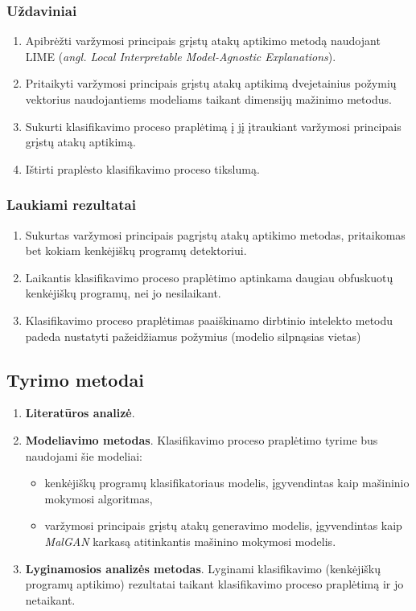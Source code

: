 \subsubsection{Uždaviniai}
\begin{enumerate}
    \item Apibrėžti varžymosi principais grįstų atakų aptikimo metodą naudojant LIME
          (\textit{angl. Local Interpretable Model-Agnostic Explanations}).
    \item Pritaikyti varžymosi principais grįstų atakų aptikimą dvejetainius požymių
          vektorius naudojantiems modeliams taikant dimensijų mažinimo metodus.
    \item Sukurti klasifikavimo proceso praplėtimą į jį įtraukiant varžymosi principais
          grįstų atakų aptikimą.
    \item Ištirti praplėsto klasifikavimo proceso tikslumą.
\end{enumerate}

\subsubsection{Laukiami rezultatai}
\begin{enumerate}
    \item Sukurtas varžymosi principais pagrįstų atakų aptikimo metodas, pritaikomas bet
          kokiam kenkėjiškų programų detektoriui.
    \item Laikantis klasifikavimo proceso praplėtimo aptinkama daugiau obfuskuotų
          kenkėjiškų programų, nei jo nesilaikant.
    \item Klasifikavimo proceso praplėtimas paaiškinamo dirbtinio intelekto metodu padeda
          nustatyti pažeidžiamus požymius (modelio silpnąsias vietas)
\end{enumerate}

\subsection{Tyrimo metodai}

\begin{enumerate}
    \item \textbf{Literatūros analizė}.
    \item \textbf{Modeliavimo metodas}. Klasifikavimo proceso praplėtimo tyrime bus naudojami šie modeliai:
          \begin{itemize}
              \item kenkėjiškų programų klasifikatoriaus modelis, įgyvendintas kaip mašininio
                    mokymosi algoritmas,
              \item varžymosi principais grįstų atakų generavimo modelis, įgyvendintas kaip
                    \textit{MalGAN} karkasą atitinkantis mašinino mokymosi modelis.
          \end{itemize}
    \item \textbf{Lyginamosios analizės metodas}. Lyginami klasifikavimo (kenkėjiškų programų aptikimo) rezultatai taikant klasifikavimo proceso praplėtimą ir jo netaikant.
\end{enumerate}

